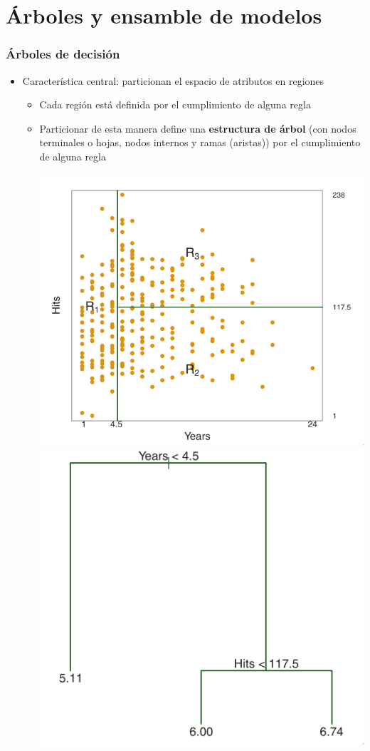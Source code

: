 \documentclass[leqno, 10pt, envcountsect]{beamer}
\numberwithin{equation}{section}
\theoremstyle{definition}
\theoremstyle{example}
\numberwithin{figure}{section}
\numberwithin{table}{section}
\let\olditem\item
\renewcommand{\item}{%
\olditem\vspace{1pt}}
\begin{document}
\section{Árboles y ensamble de modelos}
\label{sec:arboles_y_modelos_de_}

\begin{frame}
  \frametitle{Árboles de decisión}
  \begin{itemize}
    \item Característica central: particionan el espacio de atributos en
      regiones
      \begin{itemize}
        \item Cada región está definida por el cumplimiento de alguna regla
        \item Particionar de esta manera define una \textbf{estructura de árbol}
          (con nodos terminales o hojas, nodos internos y ramas (aristas))
          por el cumplimiento de alguna regla
          \begin{center}
            \includegraphics[scale=0.2]{tree_regions.png}
            \includegraphics[scale=0.23]{tree.png}

\end{center}
\end{itemize}
\end{itemize}
\end{frame}
\end{document}
